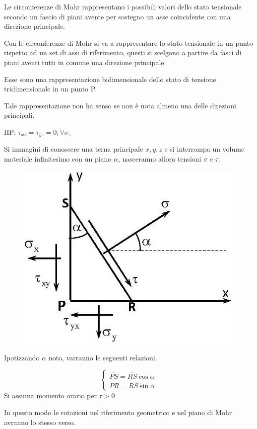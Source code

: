 \documentclass{article}
\begin{document}
\begin{adjustwidth}{2in}{}
	Le circonferenze di Mohr rappresentano i possibili valori dello stato tensionale secondo un fascio di piani avente per sostegno un asse coincidente con una direzione principale. \newline 
	
	Con le circonferenze di Mohr si va a rappresentare lo stato tensionale in un punto rispetto ad un set di assi di riferimento, questi si scelgono a partire da fasci di piani aventi tutti in comune una direzione principale. 	\newline 
	
	Esse sono una rappresentazione bidimensionale dello stato di tensione tridimensionale in un
	punto P. \newline
	
	Tale rappresentazione non ha senso se non è nota almeno una delle direzioni principali. \newline
	
	HP: $\tau_{xz} = \tau_{yz} = 0; \forall \sigma_z $ \newline
	
	Si immagini di conoscere una terna principale $x,y,z$ e si interrompa un volume materiale infinitesimo con un piano $\alpha$, nasceranno allora tensioni $\sigma$ e $\tau$. 
	
\begin{figure}[H]
	\centering
	\includegraphics[width=0.4\linewidth]{immagini/1.PARTE7_Pagina_38}
\end{figure} 

	Ipotizzando $\alpha$ noto, varranno le seguenti relazioni. 
	
	\[
	\begin{cases}
		\overline{PS} = \overline{RS} \cos\alpha\\
	\overline{PR} = \overline{RS} \sin\alpha
	\end{cases}
	\]
	Si assuma momento orario per $ \tau > 0 $
	
	In questo modo le rotazioni nel
	riferimento geometrico e
	nel piano di Mohr avranno lo
	stesso verso. \newline 
	

\end{adjustwidth}
\end{document}
